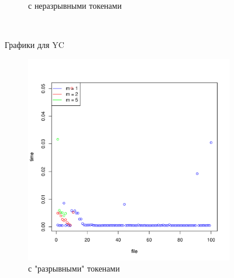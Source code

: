 \documentclass{matmex-diploma}
\begin{document}
\begin{figure}
\begin{subfigure}[b]{0.45\textwidth}
                \caption{с неразрывными токенами}
                \label{fig:YC_withoutBreak}
        \end{subfigure}
        ~ %
        \caption{Графики для YC}\label{fig:graphs_yc}
\end{figure}

\begin{figure}
        \centering
        \begin{subfigure}[b]{0.45\textwidth}
                \includegraphics[width=\textwidth]{Alvor_withBreak}
                \caption{с "разрывными" токенами}
                \label{fig:Alvor_withBreak}
        \end{subfigure}%
        ~ %
        \begin{subfigure}[b]{0.45\textwidth}

\end{subfigure}
\end{figure}
\end{document}
